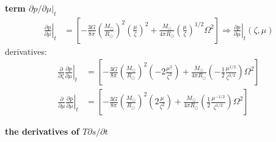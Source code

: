 \documentclass[12pt,a4paper]{article}
\newcommand{\pfird}[2][]{\frac{\partial#1}{\partial#2}}
\newcommand{\lpfird}[2][]{\partial#1/\partial#2}
\begin{document}
\textbf{term $\lpfird[p]{\mu}|_t$}
\begin{align}
  \left.\pfird[p]{\mu}\right|_t &= \left[-\frac{3G}{8\pi}\left(\frac{M_\odot}{R_\odot}\right)^2\left(\frac{\mu}{\zeta}\right)^2 + \frac{M_\odot}{4\pi R_\odot}\left(\frac{\mu}{\zeta}\right)^{1/2} \Omega^2\right] \Rightarrow \left.\pfird[p]{\mu}\right|_t\left(\zeta, \mu\right)
\end{align}
derivatives:
\begin{align}
  \pfird[]{\zeta}\left.\pfird[p]{\mu}\right|_t  &= \left[-\frac{3G}{8\pi}\left(\frac{M_\odot}{R_\odot}\right)^2\left(-2\frac{\mu^2}{\zeta^3}\right) + \frac{M_\odot}{4\pi R_\odot}\left(-\frac{1}{2}\frac{\mu^{1/2}}{\zeta^{3/2}}\right) \Omega^2\right]\\
  \pfird[]{\mu}\left.\pfird[p]{\mu}\right|_t  &= \left[-\frac{3G}{8\pi}\left(\frac{M_\odot}{R_\odot}\right)^2\left(2\frac{\mu}{\zeta^2}\right) + \frac{M_\odot}{4\pi R_\odot}\left(\frac{1}{2}\frac{\mu^{-1/2}}{\zeta^{1/2}}\right) \Omega^2\right]
\end{align}

\noindent\textbf{the derivatives of $T\lpfird[s]{t}$}
\end{document}
